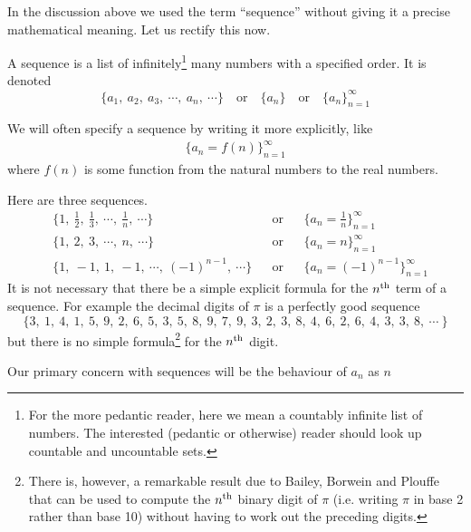 In the discussion above we used the term ``sequence'' without giving
it a precise mathematical meaning. Let us rectify this now.
\begin{defn}\label{def:SRsequence}
A sequence is a list of infinitely\footnote{For the more pedantic reader,
here we mean a countably infinite list of numbers. The interested (pedantic or otherwise) reader should look up countable and uncountable sets.}
many numbers with a specified order.
It is denoted
\begin{equation*}
\big\{a_1,\ a_2,\ a_3,\  \cdots,\ a_n,\ \cdots\big\}
\quad\text{or}\quad
\big\{a_n\big\}
\quad\text{or}\quad
\big\{a_n\big\}_{n=1}^\infty
\end{equation*}
\end{defn}
\noindent We will often specify a sequence by writing it more explicitly, like
\begin{align*}
\Big\{ a_n = f(n) \Big\}_{n=1}^\infty
\end{align*}
where $f(n)$ is some function from the natural numbers to the real numbers.
\begin{eg}\label{eg:SRsequence}
Here are three sequences.
\begin{align*}
&\Big\{1,\ \frac{1}{2},\ \frac{1}{3},\ \cdots,\ \frac{1}{n},\ \cdots\Big\}
&&\text{or}
&&\Big\{a_n=\frac{1}{n}\Big\}_{n=1}^\infty \\[0.1in]
&\Big\{1,\ 2,\ 3,\ \cdots,\ n,\ \cdots\Big\}
&&\text{or}
&&\Big\{a_n=n\Big\}_{n=1}^\infty \\[0.1in]
&\Big\{1,\ -1,\ 1,\ -1,\ \cdots,\ (-1)^{n-1},\ \cdots\Big\}
&&\text{or}
&&\Big\{a_n=(-1)^{n-1}\Big\}_{n=1}^\infty
\end{align*}
It is not necessary that there be a simple explicit formula for the
$n^{\rm th}$ term of a sequence. For example the decimal digits of
$\pi$ is a perfectly good sequence
\begin{equation*}
\big\{3,\ 1,\ 4,\ 1,\ 5,\ 9,\ 2,\ 6,\ 5,\ 3,\ 5,\ 8,\ 9,\ 7,\ 9,\ 3,\ 2,\ 3,\
8,\ 4,\ 6,\ 2,\ 6,\ 4,\ 3,\ 3,\ 8,\ \cdots\ \big\}
\end{equation*}
but there is no simple formula\footnote{There is, however, a remarkable
result due to Bailey, Borwein and Plouffe that can be used to compute
the $n^{\rm th}$ binary digit of $\pi$ (i.e. writing $\pi$ in base 2 rather
than base 10) without having to work out the preceding digits.} for the $n^{\rm th}$ digit.

\end{eg}
Our primary concern with sequences will be the behaviour of $a_n$ as $n$

